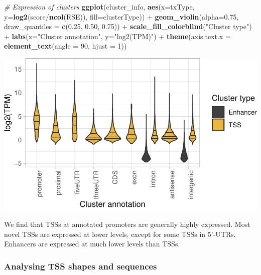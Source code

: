 \documentclass[9pt,a4paper,]{extarticle}
\newenvironment{Shaded}{\begin{snugshade}}{\end{snugshade}}
\newcommand{\KeywordTok}[1]{\textcolor[rgb]{0.13,0.29,0.53}{\textbf{{#1}}}}
\newcommand{\DataTypeTok}[1]{\textcolor[rgb]{0.13,0.29,0.53}{{#1}}}
\newcommand{\DecValTok}[1]{\textcolor[rgb]{0.00,0.00,0.81}{{#1}}}
\newcommand{\FloatTok}[1]{\textcolor[rgb]{0.00,0.00,0.81}{{#1}}}
\newcommand{\StringTok}[1]{\textcolor[rgb]{0.31,0.60,0.02}{{#1}}}
\newcommand{\CommentTok}[1]{\textcolor[rgb]{0.56,0.35,0.01}{\textit{{#1}}}}
\newcommand{\NormalTok}[1]{{#1}}
\begin{document}
\begin{Shaded}
\begin{Highlighting}[]
\CommentTok{# Expression of clusters}
\KeywordTok{ggplot}\NormalTok{(cluster_info, }\KeywordTok{aes}\NormalTok{(}\DataTypeTok{x=}\NormalTok{txType, }\DataTypeTok{y=}\KeywordTok{log2}\NormalTok{(score/}\KeywordTok{ncol}\NormalTok{(RSE)), }\DataTypeTok{fill=}\NormalTok{clusterType)) +}
\StringTok{    }\KeywordTok{geom_violin}\NormalTok{(}\DataTypeTok{alpha=}\FloatTok{0.75}\NormalTok{, }\DataTypeTok{draw_quantiles =} \KeywordTok{c}\NormalTok{(}\FloatTok{0.25}\NormalTok{, }\FloatTok{0.50}\NormalTok{, }\FloatTok{0.75}\NormalTok{)) +}
\StringTok{    }\KeywordTok{scale_fill_colorblind}\NormalTok{(}\StringTok{"Cluster type"}\NormalTok{) +}
\StringTok{    }\KeywordTok{labs}\NormalTok{(}\DataTypeTok{x=}\StringTok{"Cluster annotation"}\NormalTok{, }\DataTypeTok{y=}\StringTok{"log2(TPM)"}\NormalTok{) +}
\StringTok{    }\KeywordTok{theme}\NormalTok{(}\DataTypeTok{axis.text.x =} \KeywordTok{element_text}\NormalTok{(}\DataTypeTok{angle =} \DecValTok{90}\NormalTok{, }\DataTypeTok{hjust =} \DecValTok{1}\NormalTok{))}
\end{Highlighting}
\end{Shaded}

\begin{center}\includegraphics{CAGEWorkflow_files/figure-latex/plotTxTypes-2} \end{center}

We find that TSSs at annotated promoters are generally highly expressed. Most novel TSSs are expressed at lower levels, except for some TSSs in 5'-UTRs. Enhancers are expressed at much lower levels than TSSs.

\subsubsection{Analysing TSS shapes and sequences}\label{analysing-tss-shapes-and-sequences}
\end{document}
